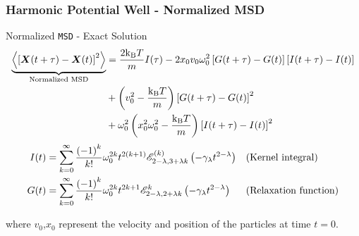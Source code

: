 \documentclass[a4paper,10pt]{beamer}
\newcommand{\BS}[1]{\boldsymbol{#1}}
\newcommand{\sqb}[1]{\left[ #1 \right]}
\newcommand{\rb}[1]{\left( #1 \right)}
\newcommand{\angbrac}[1]{\left \langle #1 \right \rangle}
\begin{document}
	\begin{frame}
		\frametitle{Harmonic Potential Well - Normalized MSD}
		\begin{alertblock}{Normalized \texttt{MSD} - Exact Solution}
			\footnotesize
			\begin{align}
				\notag
				\underbrace{\angbrac{\sqb{\BS{X}(t+\tau)-\BS{X}(t)}^{2}}}_{\text{Normalized MSD}} &= \frac{2\text{k}_{\text{B}}T}{m} I(\tau) - 2 x_{0} v_{0} \omega_{0}^{2} \sqb{G(t+\tau) - G(t)}\sqb{I(t+\tau) - I(t)} \\
				\notag 
				&+ \rb{v_{0}^{2} - \frac{\text{k}_{\text{B}}T}{m}} \sqb{G(t+\tau)-G(t)}^{2} \\
				\notag
				&+ \omega_{0}^{2} \rb{x_{0}^{2} \omega_{0}^{2} - \frac{\text{k}_\text{B} T}{m}} \sqb{I(t+\tau)-I(t)}^{2}
			\end{align}
			\begin{align}
				\notag
				I(t) &= \sum_{k=0}^{\infty} \frac{\rb{-1}^{k}}{k!} \omega_{0}^{2k} t^{2(k+1)} \mathscr{E}^{(k)}_{2-\lambda,3+\lambda k} \rb{- \gamma_{\lambda} t^{2-\lambda}} && \text{(Kernel integral)}\\
				\notag
				G(t) &= \sum_{k=0}^{\infty} \frac{\rb{-1}^{k}}{k!} \omega_{0}^{2k} t^{2k+1} \mathscr{E}^{k}_{2-\lambda,2+\lambda k} \rb{- \gamma_{\lambda} t^{2-\lambda}} && \text{(Relaxation function)}
			\end{align}
		\end{alertblock}
		where $v_{0}$,$x_{0}$ represent the velocity and position of the particles at time $t=0$.
	\end{frame}
\end{document}

